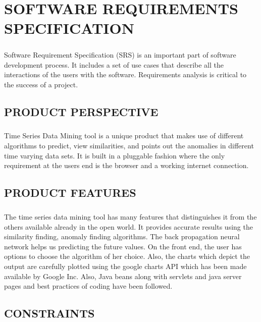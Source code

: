 \documentclass[12pt]{report}
\begin{document}
\chapter{SOFTWARE REQUIREMENTS SPECIFICATION}

\paragraph{}Software Requirement Specification (SRS) is an important part of software development process. It includes a set of use cases that describe all the interactions of the users with the software. Requirements analysis is critical to the success of a project. \\

\section{PRODUCT PERSPECTIVE}

\paragraph{} Time Series Data Mining tool is a unique product that makes use of different algorithms to predict, view similarities, and points out the anomalies in different time varying data sets. It is built in a pluggable fashion where the only requirement at the users end is the browser and a working internet connection. 
\section{PRODUCT FEATURES}
\paragraph{} 
The time series data mining tool has many features that distinguishes it from the others available already in the open world. It provides accurate results using the similarity finding, anomaly finding algorithms. The back propagation neural network helps us predicting the future values. On the front end, the user has options to choose the algorithm of her choice. Also, the charts which depict the output are carefully plotted using the google charts API which has been made available by Google Inc. Also, Java beans along with servlets and java server pages and best practices of coding have been followed. 
 
\section{CONSTRAINTS}
\end{document}
